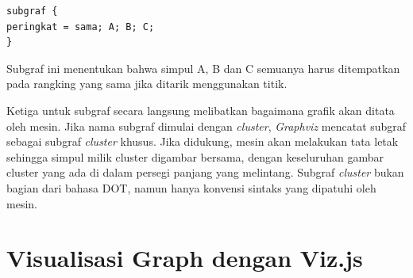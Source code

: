 \begin{lstlisting}
subgraf {
peringkat = sama; A; B; C;
}
\end{lstlisting}

Subgraf ini menentukan bahwa simpul A, B dan C semuanya harus ditempatkan pada rangking yang sama jika ditarik menggunakan titik.

Ketiga untuk subgraf secara langsung melibatkan bagaimana grafik akan ditata oleh mesin. Jika nama subgraf dimulai dengan \textit{cluster}, \textit{Graphviz} mencatat subgraf sebagai subgraf \textit{cluster} khusus. Jika didukung, mesin akan melakukan tata letak sehingga simpul milik cluster digambar bersama, dengan keseluruhan gambar cluster yang ada di dalam persegi panjang yang melintang. Subgraf \textit{cluster} bukan bagian dari bahasa DOT, namun hanya konvensi sintaks yang dipatuhi oleh mesin.  

\section{Visualisasi Graph dengan Viz.js}
\label{sec: Visualisasi Graph dengan Viz.js}

